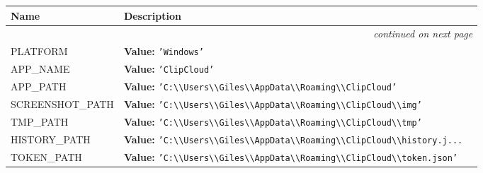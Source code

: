     \vspace{-1cm}
\hspace{\varindent}\begin{longtable}{|p{\varnamewidth}|p{\vardescrwidth}|l}
\cline{1-2}
\cline{1-2} \centering \textbf{Name} & \centering \textbf{Description}& \\
\cline{1-2}
\endhead\cline{1-2}\multicolumn{3}{r}{\small\textit{continued on next page}}\\\endfoot\cline{1-2}
\endlastfoot\raggedright P\-L\-A\-T\-F\-O\-R\-M\- & \raggedright \textbf{Value:} 
{\tt \texttt{'}\texttt{Windows}\texttt{'}}&\\
\cline{1-2}
\raggedright A\-P\-P\-\_\-N\-A\-M\-E\- & \raggedright \textbf{Value:} 
{\tt \texttt{'}\texttt{ClipCloud}\texttt{'}}&\\
\cline{1-2}
\raggedright A\-P\-P\-\_\-P\-A\-T\-H\- & \raggedright \textbf{Value:} 
{\tt \texttt{'}\texttt{C:{\textbackslash}{\textbackslash}Users{\textbackslash}{\textbackslash}Giles{\textbackslash}{\textbackslash}AppData{\textbackslash}{\textbackslash}Roaming{\textbackslash}{\textbackslash}ClipCloud}\texttt{'}}&\\
\cline{1-2}
\raggedright S\-C\-R\-E\-E\-N\-S\-H\-O\-T\-\_\-P\-A\-T\-H\- & \raggedright \textbf{Value:} 
{\tt \texttt{'}\texttt{C:{\textbackslash}{\textbackslash}Users{\textbackslash}{\textbackslash}Giles{\textbackslash}{\textbackslash}AppData{\textbackslash}{\textbackslash}Roaming{\textbackslash}{\textbackslash}ClipCloud{\textbackslash}{\textbackslash}img}\texttt{'}}&\\
\cline{1-2}
\raggedright T\-M\-P\-\_\-P\-A\-T\-H\- & \raggedright \textbf{Value:} 
{\tt \texttt{'}\texttt{C:{\textbackslash}{\textbackslash}Users{\textbackslash}{\textbackslash}Giles{\textbackslash}{\textbackslash}AppData{\textbackslash}{\textbackslash}Roaming{\textbackslash}{\textbackslash}ClipCloud{\textbackslash}{\textbackslash}tmp}\texttt{'}}&\\
\cline{1-2}
\raggedright H\-I\-S\-T\-O\-R\-Y\-\_\-P\-A\-T\-H\- & \raggedright \textbf{Value:} 
{\tt \texttt{'}\texttt{C:{\textbackslash}{\textbackslash}Users{\textbackslash}{\textbackslash}Giles{\textbackslash}{\textbackslash}AppData{\textbackslash}{\textbackslash}Roaming{\textbackslash}{\textbackslash}ClipCloud{\textbackslash}{\textbackslash}history.j}\texttt{...}}&\\
\cline{1-2}
\raggedright T\-O\-K\-E\-N\-\_\-P\-A\-T\-H\- & \raggedright \textbf{Value:} 
{\tt \texttt{'}\texttt{C:{\textbackslash}{\textbackslash}Users{\textbackslash}{\textbackslash}Giles{\textbackslash}{\textbackslash}AppData{\textbackslash}{\textbackslash}Roaming{\textbackslash}{\textbackslash}ClipCloud{\textbackslash}{\textbackslash}token.json}\texttt{'}}&\\

\end{longtable}
